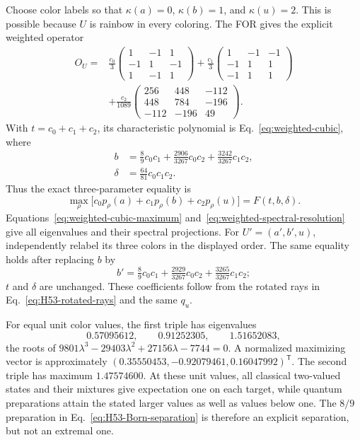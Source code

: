 \documentclass[aps,pra,reprint,superscriptaddress,longbibliography,nofootinbib,floatfix,10pt]{revtex4-2}
\theoremstyle{definition}\newtheorem{definition}[theorem]{Definition}
\theoremstyle{remark}\newtheorem{remark}[theorem]{Remark}
\begin{document}
Choose color labels so that $\kappa(a)=0$, $\kappa(b)=1$, and $\kappa(u)=2$. This is possible because $U$ is rainbow in every coloring. The FOR gives the explicit weighted operator
\begin{equation}\label{eq:weighted-H53-operator}
\begin{aligned}
O_U={}&\frac{c_0}{3}\begin{pmatrix}1&-1&1\\-1&1&-1\\1&-1&1\end{pmatrix}
+\frac{c_1}{3}\begin{pmatrix}1&-1&-1\\-1&1&1\\-1&1&1\end{pmatrix}\\
&+\frac{c_2}{1089}\begin{pmatrix}256&448&-112\\448&784&-196\\-112&-196&49\end{pmatrix}.
\end{aligned}
\end{equation}
With $t=c_0+c_1+c_2$, its characteristic polynomial is Eq.~\eqref{eq:weighted-cubic}, where
\begin{equation}\label{eq:weighted-H53-coefficients}
\begin{aligned}
b&=\tfrac89c_0c_1+\tfrac{2906}{3267}c_0c_2+\tfrac{3242}{3267}c_1c_2,\\
\delta&=\tfrac{64}{81}c_0c_1c_2.
\end{aligned}
\end{equation}
Thus the exact three-parameter equality is
\begin{equation}\label{eq:weighted-H53-max}
\max_\rho\bigl[c_0p_\rho(a)+c_1p_\rho(b)+c_2p_\rho(u)\bigr]
=F(t,b,\delta).
\end{equation}
Equations~\eqref{eq:weighted-cubic-maximum} and~\eqref{eq:weighted-spectral-resolution} give all eigenvalues and their spectral projections. For $U'=(a',b',u)$, independently relabel its three colors in the displayed order. The same equality holds after replacing $b$ by
\begin{equation}\label{eq:weighted-H53-prime}
b'=\tfrac89c_0c_1+\tfrac{2929}{3267}c_0c_2+\tfrac{3265}{3267}c_1c_2;
\end{equation}
$t$ and $\delta$ are unchanged. These coefficients follow from the rotated rays in Eq.~\eqref{eq:H53-rotated-rays} and the same $q_u$.

For equal unit color values, the first triple has eigenvalues
\[
0.57095612,\qquad0.91252305,\qquad1.51652083,
\]
the roots of $9801\lambda^3-29403\lambda^2+27156\lambda-7744=0$. A normalized maximizing vector is approximately $(0.35550453,-0.92079461,0.16047992)^{\mathsf T}$. The second triple has maximum $1.47574600$. At these unit values, all classical two-valued states and their mixtures give expectation one on each target, while quantum preparations attain the stated larger values as well as values below one. The $8/9$ preparation in Eq.~\eqref{eq:H53-Born-separation} is therefore an explicit separation, but not an extremal one.
\end{document}
